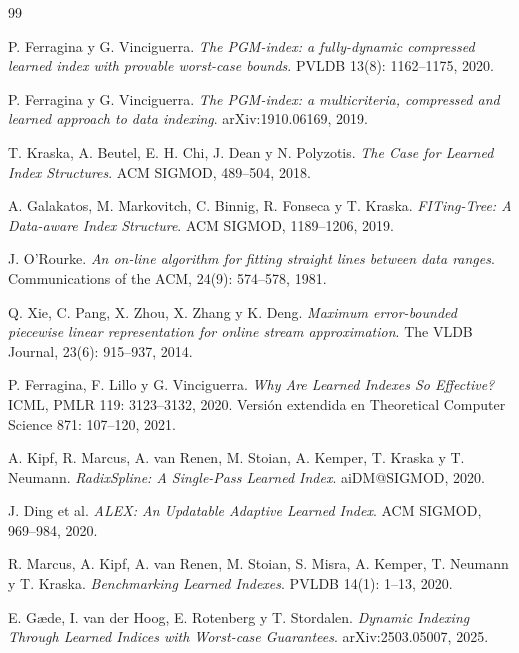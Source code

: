 \documentclass[11pt,a4paper]{article}
\begin{document}
\small
\begin{thebibliography}{99}
\setlength{\itemsep}{0pt}

P. Ferragina y G. Vinciguerra.
\emph{The PGM-index: a fully-dynamic compressed learned index with provable worst-case
bounds}. PVLDB 13(8): 1162--1175, 2020.

P. Ferragina y G. Vinciguerra.
\emph{The PGM-index: a multicriteria, compressed and learned approach to data indexing}.
arXiv:1910.06169, 2019.

T. Kraska, A. Beutel, E. H. Chi, J. Dean y N. Polyzotis.
\emph{The Case for Learned Index Structures}. ACM SIGMOD, 489--504, 2018.

A. Galakatos, M. Markovitch, C. Binnig, R. Fonseca y T. Kraska.
\emph{FITing-Tree: A Data-aware Index Structure}. ACM SIGMOD, 1189--1206, 2019.

J. O'Rourke.
\emph{An on-line algorithm for fitting straight lines between data ranges}.
Communications of the ACM, 24(9): 574--578, 1981.

Q. Xie, C. Pang, X. Zhou, X. Zhang y K. Deng.
\emph{Maximum error-bounded piecewise linear representation for online stream
approximation}. The VLDB Journal, 23(6): 915--937, 2014.

P. Ferragina, F. Lillo y G. Vinciguerra.
\emph{Why Are Learned Indexes So Effective?} ICML, PMLR 119: 3123--3132, 2020.
Versión extendida en Theoretical Computer Science 871: 107--120, 2021.

A. Kipf, R. Marcus, A. van Renen, M. Stoian, A. Kemper, T. Kraska y T. Neumann.
\emph{RadixSpline: A Single-Pass Learned Index}. aiDM@SIGMOD, 2020.

J. Ding et al.
\emph{ALEX: An Updatable Adaptive Learned Index}. ACM SIGMOD, 969--984, 2020.

R. Marcus, A. Kipf, A. van Renen, M. Stoian, S. Misra, A. Kemper, T. Neumann y T. Kraska.
\emph{Benchmarking Learned Indexes}. PVLDB 14(1): 1--13, 2020.

E. Gæde, I. van der Hoog, E. Rotenberg y T. Stordalen.
\emph{Dynamic Indexing Through Learned Indices with Worst-case Guarantees}.
arXiv:2503.05007, 2025.

\end{thebibliography}
\end{document}
